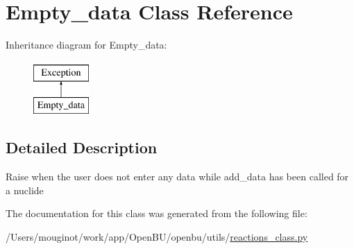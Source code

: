 \hypertarget{classopenbu_1_1utils_1_1reactions__class_1_1_empty__data}{}\section{Empty\+\_\+data Class Reference}
\label{classopenbu_1_1utils_1_1reactions__class_1_1_empty__data}
Inheritance diagram for Empty\+\_\+data\+:\begin{figure}[H]
\begin{center}
\leavevmode
\includegraphics[height=2.000000cm]{classopenbu_1_1utils_1_1reactions__class_1_1_empty__data}
\end{center}
\end{figure}


\subsection{Detailed Description}
\begin{DoxyVerb}Raise when the user does not enter any data while add_data has been called for a nuclide\end{DoxyVerb}
 

The documentation for this class was generated from the following file\+:\begin{DoxyCompactItemize}
\item 
/\+Users/mouginot/work/app/\+Open\+B\+U/openbu/utils/\mbox{\hyperlink{reactions__class_8py}{reactions\+\_\+class.\+py}}\end{DoxyCompactItemize}
